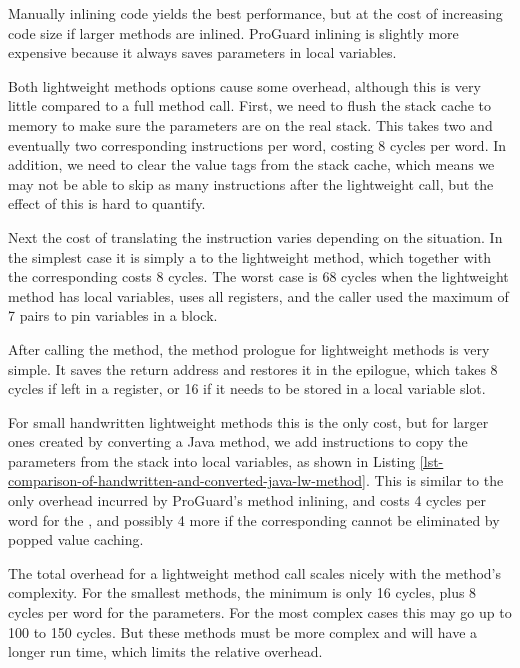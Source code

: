 Manually inlining code yields the best performance, but at the cost of increasing code size if larger methods are inlined. ProGuard inlining is slightly more expensive because it always saves parameters in local variables.

Both lightweight methods options cause some overhead, although this is very little compared to a full method call. First, we need to flush the stack cache to memory to make sure the parameters are on the real stack. This takes two  and eventually two corresponding  instructions per word, costing 8 cycles per word. In addition, we need to clear the value tags from the stack cache, which means we may not be able to skip as many  instructions after the lightweight call, but the effect of this is hard to quantify.

Next the cost of translating the  instruction varies depending on the situation. In the simplest case it is simply a  to the lightweight method, which together with the corresponding  costs 8 cycles. The worst case is 68 cycles when the lightweight method has local variables, uses all registers, and the caller used the maximum of 7 pairs to pin variables in a  block.


After calling the method, the method prologue for lightweight methods is very simple. It saves the return address and restores it in the epilogue, which takes 8 cycles if left in a register, or 16 if it needs to be stored in a local variable slot.

For small handwritten lightweight methods this is the only cost, but for larger ones created by converting a Java method, we add  instructions to copy the parameters from the stack into local variables, as shown in Listing \ref{lst-comparison-of-handwritten-and-converted-java-lw-method}. This is similar to the only overhead incurred by ProGuard's method inlining, and costs 4 cycles per word for the , and possibly 4 more if the corresponding  cannot be eliminated by popped value caching.

The total overhead for a lightweight method call scales nicely with the method's complexity. For the smallest methods, the minimum is only 16 cycles, plus 8 cycles per word for the parameters. For the most complex cases this may go up to 100 to 150 cycles. But these methods must be more complex and will have a longer run time, which limits the relative overhead.

